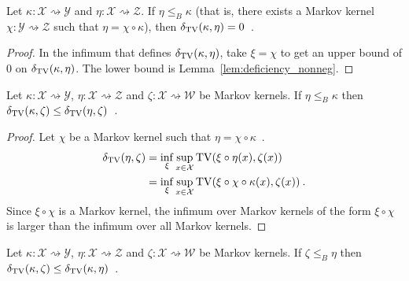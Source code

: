 \begin{lemma}
  \label{lem:deficiency_comp}
  Let $\kappa: \mathcal X \rightsquigarrow \mathcal Y$ and $\eta : \mathcal X \rightsquigarrow \mathcal Z$.
  If $\eta \le_B \kappa$ (that is, there exists a Markov kernel $\chi : \mathcal Y \rightsquigarrow \mathcal Z$ such that $\eta = \chi \circ \kappa$), then $\delta_{\operatorname{TV}}(\kappa, \eta) = 0$~.
\end{lemma}

\begin{proof}%
{}
In the infimum that defines $\delta_{\operatorname{TV}}(\kappa, \eta)$, take $\xi = \chi$ to get an upper bound of 0 on $\delta_{\operatorname{TV}}(\kappa, \eta)$. The lower bound is Lemma~\ref{lem:deficiency_nonneg}.
\end{proof}

\begin{lemma}
  \label{lem:deficiency_antimono_left}
  Let $\kappa: \mathcal X \rightsquigarrow \mathcal Y$, $\eta : \mathcal X \rightsquigarrow \mathcal Z$ and $\zeta : \mathcal X \rightsquigarrow \mathcal W$ be Markov kernels.
  If $\eta \le_B \kappa$ then $\delta_{\operatorname{TV}}(\kappa, \zeta) \le \delta_{\operatorname{TV}}(\eta, \zeta)$~.
\end{lemma}

\begin{proof}%
\uses{}
Let $\chi$ be a Markov kernel such that $\eta = \chi \circ \kappa$~.
\begin{align*}
\delta_{\operatorname{TV}}(\eta, \zeta)
&= \inf_{\xi} \sup_{x \in \mathcal X} \operatorname{TV}(\xi \circ \eta (x), \zeta(x))
\\
&= \inf_\xi \sup_{x \in \mathcal X} \operatorname{TV}(\xi \circ \chi \circ \kappa (x), \zeta(x))
\: .
\end{align*}
Since $\xi \circ \chi$ is a Markov kernel, the infimum over Markov kernels of the form $\xi \circ \chi$ is larger than the infimum over all Markov kernels.
\end{proof}

\begin{lemma}
  \label{lem:deficiency_mono_right}
  Let $\kappa: \mathcal X \rightsquigarrow \mathcal Y$, $\eta : \mathcal X \rightsquigarrow \mathcal Z$ and $\zeta : \mathcal X \rightsquigarrow \mathcal W$ be Markov kernels.
  If $\zeta \le_B \eta$ then $\delta_{\operatorname{TV}}(\kappa, \zeta) \le \delta_{\operatorname{TV}}(\kappa, \eta)$~.
\end{lemma}

